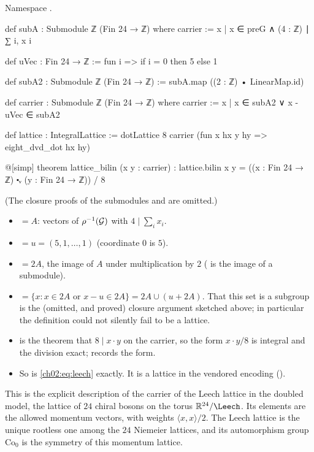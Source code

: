 \begin{definition}\label{ch02:def:leechcarrier}
Namespace .
\end{definition}
\begin{leancode}
def subA : Submodule ℤ (Fin 24 → ℤ) where
  carrier := {x | x ∈ preG ∧ (4 : ℤ) ∣ ∑ i, x i}

def uVec : Fin 24 → ℤ := fun i => if i = 0 then 5 else 1

def subA2 : Submodule ℤ (Fin 24 → ℤ) := subA.map ((2 : ℤ) • LinearMap.id)

def carrier : Submodule ℤ (Fin 24 → ℤ) where
  carrier := {x | x ∈ subA2 ∨ x - uVec ∈ subA2}

def lattice : IntegralLattice := dotLattice 8 carrier (fun x hx y hy => eight_dvd_dot hx hy)

@[simp] theorem lattice_bilin (x y : carrier) :
    lattice.bilin x y = ((x : Fin 24 → ℤ) ⬝ᵥ (y : Fin 24 → ℤ)) / 8
\end{leancode}
(The closure proofs of the submodules  and  are omitted.)
\begin{dictionary}
\begin{itemize}
\item {} $=A$: vectors of $\rho^{-1}(\mathcal{G})$ with $4\mid\sum_ix_i$.
\item {} $=u=(5,1,\dots,1)$ (coordinate $0$ is $5$).
\item {} $=2A$, the image of $A$ under multiplication by $2$ ( is the image of
  a submodule).
\item {} $=\{x: x\in2A\text{ or }x-u\in2A\}=2A\cup(u+2A)$.  That this set is a
  subgroup is the (omitted, and proved) closure argument sketched above; in particular the
  definition could not silently fail to be a lattice.
\item {} is the theorem that $8\mid x\cdot y$ on the carrier, so the form
  $x\cdot y/8$ is integral and the division exact;  records the form.
\item So  is \eqref{ch02:eq:leech} exactly.  It is a lattice in the vendored
  encoding ().
\end{itemize}
\end{dictionary}
\begin{physics}
This is the explicit description of the carrier of the Leech lattice in the doubled model, the lattice of $24$ chiral bosons on the torus $\mathbb{R}^{24}/\Leech$. Its elements are the allowed momentum vectors, with weights $\langle x,x\rangle/2$. The Leech lattice is the unique rootless one among the $24$ Niemeier lattices, and its automorphism group $\mathrm{Co}_0$ is the symmetry of this momentum lattice.
\end{physics}

